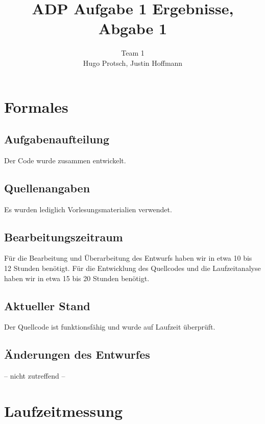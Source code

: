 \documentclass[11pt]{article}
\title{ADP Aufgabe 1 Ergebnisse, Abgabe 1}
\author{Team 1\\Hugo Protsch, Justin Hoffmann}
\begin{document}
    \maketitle


    \section{Formales}\label{sec:Formales}


    \subsection{Aufgabenaufteilung}
    Der Code wurde zusammen entwickelt.

    \subsection{Quellenangaben}

    Es wurden lediglich Vorlesungsmaterialien verwendet.


    \subsection{Bearbeitungszeitraum}
    Für die Bearbeitung und Überarbeitung des Entwurfs haben wir in etwa 10 bis
    12 Stunden benötigt.
    Für die Entwicklung des Quellcodes und die Laufzeitanalyse haben wir in
    etwa 15 bis 20 Stunden benötigt.

    \subsection{Aktueller Stand}
    Der Quellcode ist funktionsfähig und wurde auf Laufzeit überprüft.


    \subsection{Änderungen des Entwurfes}
    -- nicht zutreffend --


    \section{Laufzeitmessung}\label{sec:laufzeitmessung}
    
\end{document}
